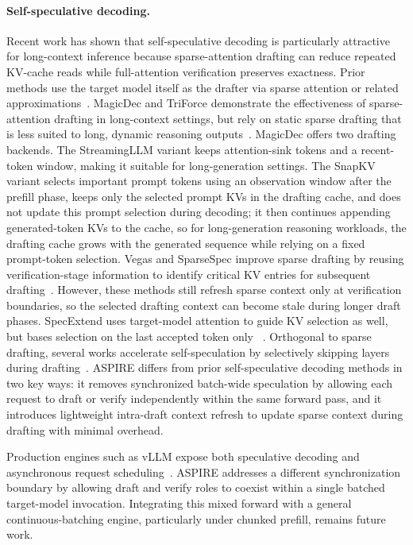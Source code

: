 \paragraph{Self-speculative decoding.}
Recent work has shown that self-speculative decoding is particularly attractive for long-context inference because sparse-attention drafting can reduce repeated KV-cache reads while full-attention verification preserves exactness. Prior methods use the target model itself as the drafter via sparse attention or related approximations~\citep{chen2025rapid, ji2025specvlm}. MagicDec and TriForce demonstrate the effectiveness of sparse-attention drafting in long-context settings, but rely on static sparse drafting that is less suited to long, dynamic reasoning outputs~\citep{sadhukhan2025magicdec, sun2024triforce}. MagicDec offers two drafting backends. The StreamingLLM variant keeps attention-sink tokens and a recent-token window, making it suitable for long-generation settings. The SnapKV variant selects important prompt tokens using an observation window after the prefill phase, keeps only the selected prompt KVs in the drafting cache, and does not update this prompt selection during decoding; it then continues appending generated-token KVs to the cache, so for long-generation reasoning workloads, the drafting cache grows with the generated sequence while relying on a fixed prompt-token selection. Vegas and SparseSpec improve sparse drafting by reusing verification-stage information to identify critical KV entries for subsequent drafting~\citep{yue2026vegas, zhao2026accelerating}. However, these methods still refresh sparse context only at verification boundaries, so the selected drafting context can become stale during longer draft phases. SpecExtend uses target-model attention to guide KV selection as well, but bases selection on the last accepted token only ~\citep{cha-etal-2026-specextend}. Orthogonal to sparse drafting, several works accelerate self-speculation by selectively skipping layers during drafting~\citep{elhoushi2024layerskip, zarch2025del, xia2025swift}. ASPIRE differs from prior self-speculative decoding methods in two key ways: it removes synchronized batch-wide speculation by allowing each request to draft or verify independently within the same forward pass, and it introduces lightweight intra-draft context refresh to update sparse context during drafting with minimal overhead.

 Production engines such as vLLM expose both speculative decoding and asynchronous request scheduling~\citep{kwon2023efficient, vllm2026async, vllm2026specdecode}. ASPIRE addresses a different synchronization boundary by allowing draft and verify roles to coexist within a single batched target-model invocation. Integrating this mixed forward with a general continuous-batching engine, particularly under chunked prefill, remains future work.
